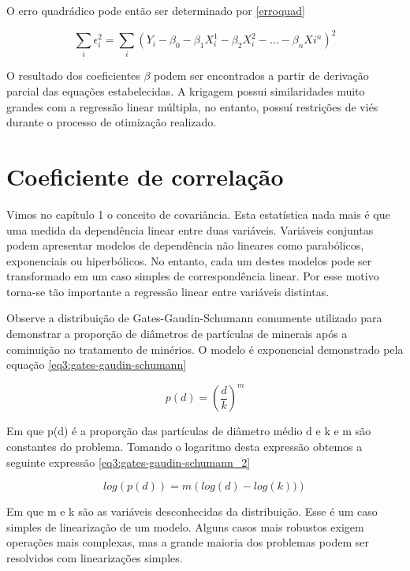  O erro quadrádico pode então ser determinado por \eqref{erroquad}
 
 \begin{equation}\label{erroquad}
 \sum_{i} \epsilon_{i}^2 = \sum_{i} \left( Y_{i} - \beta_{0} - \beta_{1} X_{i}^{1} - \beta_{2} X_{i}^{2} - ... - \beta_{n}X{i}^{n}\right) ^2 
 \end{equation}
 
 O resultado dos coeficientes $\beta$ podem ser encontrados a partir de derivação parcial das equações estabelecidas. A krigagem possui similaridades muito grandes com a regressão linear múltipla, no entanto, possuí restrições de viés durante o processo de otimização realizado. 
  
  \section{Coeficiente de correlação }
  
  Vimos no capítulo 1 o conceito de covariância. Esta estatística nada mais é que uma medida da dependência linear entre duas variáveis. Variáveis conjuntas podem apresentar modelos de dependência não lineares como parabólicos, exponenciais ou hiperbólicos. No entanto, cada um destes modelos pode ser transformado em um caso simples de correspondência linear. Por esse motivo torna-se tão importante a regressão linear entre variáveis distintas.
  
  Observe a distribuição de Gates-Gaudin-Schumann comumente utilizado para demonstrar a proporção de diâmetros de partículas de minerais após a cominuição no tratamento de minérios. O modelo é exponencial demonstrado pela equação \eqref{eq3:gates-gaudin-schumann} 
  
    \begin{equation}\label{eq3:gates-gaudin-schumann}
    p(d) = \left( \frac{d}{k}\right)^m 
    \end{equation}
    
 Em que p(d) é a proporção das partículas de diâmetro médio d e k e m são constantes do problema. Tomando o logaritmo desta expressão obtemos a seguinte expressão \eqref{eq3:gates-gaudin-schumann_2}
 
  \begin{equation}\label{eq3:gates-gaudin-schumann_2}
  log(p(d)) =  m \left( log(d)-log(k)) \right)
  \end{equation}
 
Em que m e k são as variáveis desconhecidas da distribuição. Esse é um caso simples de linearização de um modelo. Alguns casos mais robustos exigem operações mais complexas, mas a grande maioria dos problemas podem ser resolvidos com linearizações simples. 

